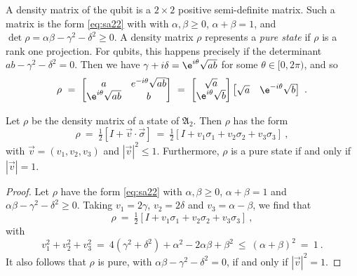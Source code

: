 \documentclass[12pt]{amsart}
\numberwithin{equation}{section}
\numberwithin{figure}{section}
\theoremstyle{theorem}
\begin{document}
A density matrix of the qubit is a $2\times 2$ positive semi-definite 
	matrix.  Such a matrix  is  the form \eqref{eq:sa22} with 
	with $\alpha,\beta\ge 0$, $\alpha+\beta=1$, and $\det \rho = 
	\alpha \beta -\gamma^2-\delta^2 \ge 0$.  A density matrix $\rho$ 
	represents a \emph{pure state} if $\rho$ is a rank one projection.  For 
	qubits, 
	this happens precisely if the determinant $ab-\gamma^2-\delta^2 =0$.  
	Then we have 
	$\gamma+i \delta =\e^{i\theta }\sqrt{ab}$ for 
	some $\theta \in [0,2\pi)$, and so
	$$\rho \ = \ \begin{bmatrix} a & e^{-i\theta} \sqrt{ab} \\
		\e^{i\theta} \sqrt{ab} & b \end{bmatrix} \ = \ 
	\begin{bmatrix}\sqrt{a} 
		\\
		\e^{i\theta} \sqrt{b} \end{bmatrix} \begin{bmatrix} \sqrt{a} & 
		\e^{-i\theta} \sqrt{b} \end{bmatrix} \ . $$
	\begin{prop} Let $\rho$ be the density matrix 
		of a state of $\mathfrak{A}_2$.  Then $\rho$ has the form
		\begin{equation}\label{eq:Blochsphere}
			\rho \ = \ \tfrac{1}{2} \left [ I + \vec{v}\cdot \vec{\sigma} 
			\right ] \ = \ \tfrac{1}{2}\left [ I + v_1 \sigma_1 + v_2 \sigma_2 
			+ v_3 
			\sigma_3 \right ]  \ ,
		\end{equation}
		with $\vec{v}=(v_1,v_2,v_3)$ and $|\vec{v}|^2 \le 1$.  Furthermore, 
		$\rho$ 
		is a pure state if and only 
		if $|\vec{v}|=1$. 
	\end{prop}
	\begin{proof}
		Let $\rho$ have the form \eqref{eq:sa22} with $\alpha,\beta\ge 0$, 
		$\alpha+\beta=1$ and $\alpha \beta - \gamma^2 -\delta^2\ge 0$.  Taking 
		$v_1= 2\gamma$, $v_2=2 \delta $ and $v_3 = \alpha-\beta$, we find that
		$$\rho \ = \ \tfrac{1}{2}\left [ I + v_1 \sigma_1 + v_2 \sigma_2 + v_3 
		\sigma_3 \right ]  \ , $$
		with 
		$$v_1^2 + v_2^2 + v_3^2 \ = \ 4 (\gamma^2 + \delta^2) + \alpha^2 - 2 
		\alpha\beta + \beta^2 \ \le \ (\alpha+\beta)^2 \ 
		= \ 1 \ . $$
		It also follows that $\rho$ is pure, with $\alpha \beta 
		-\gamma^2-\delta^2=0$, if and only if 
		$|\vec{v}|^2=1$. 
	\end{proof}
\end{document}
